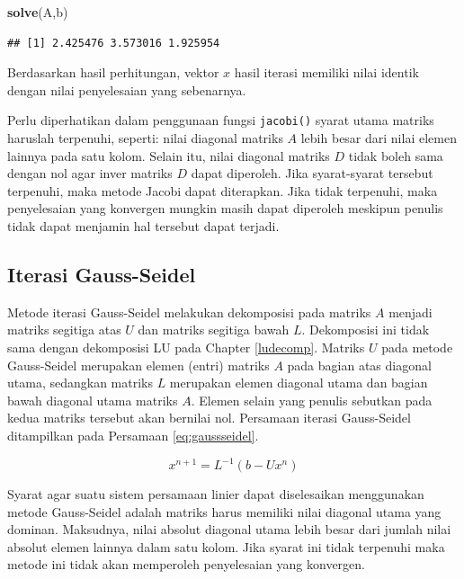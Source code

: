 \documentclass[]{book}
\newenvironment{Shaded}{\begin{snugshade}}{\end{snugshade}}
\newcommand{\KeywordTok}[1]{\textcolor[rgb]{0.13,0.29,0.53}{\textbf{#1}}}
\newcommand{\NormalTok}[1]{#1}
\theoremstyle{definition}
\theoremstyle{definition}
\theoremstyle{definition}
\theoremstyle{remark}
\begin{document}
\begin{Shaded}
\begin{Highlighting}[]
\KeywordTok{solve}\NormalTok{(A,b)}
\end{Highlighting}
\end{Shaded}

\begin{verbatim}
## [1] 2.425476 3.573016 1.925954
\end{verbatim}

Berdasarkan hasil perhitungan, vektor \(x\) hasil iterasi memiliki nilai identik dengan nilai penyelesaian yang sebenarnya.

Perlu diperhatikan dalam penggunaan fungsi \texttt{jacobi()} syarat utama matriks haruslah terpenuhi, seperti: nilai diagonal matriks \(A\) lebih besar dari nilai elemen lainnya pada satu kolom. Selain itu, nilai diagonal matriks \(D\) tidak boleh sama dengan nol agar inver matriks \(D\) dapat diperoleh. Jika syarat-syarat tersebut terpenuhi, maka metode Jacobi dapat diterapkan. Jika tidak terpenuhi, maka penyelesaian yang konvergen mungkin masih dapat diperoleh meskipun penulis tidak dapat menjamin hal tersebut dapat terjadi.

\hypertarget{seideliter}{%
\subsection{Iterasi Gauss-Seidel}\label{seideliter}}

Metode iterasi Gauss-Seidel melakukan dekomposisi pada matriks \(A\) menjadi matriks segitiga atas \(U\) dan matriks segitiga bawah \(L\). Dekomposisi ini tidak sama dengan dekomposisi LU pada Chapter \ref{ludecomp}. Matriks \(U\) pada metode Gauss-Seidel merupakan elemen (entri) matriks \(A\) pada bagian atas diagonal utama, sedangkan matriks \(L\) merupakan elemen diagonal utama dan bagian bawah diagonal utama matriks \(A\). Elemen selain yang penulis sebutkan pada kedua matriks tersebut akan bernilai nol. Persamaan iterasi Gauss-Seidel ditampilkan pada Persamaan \eqref{eq:gaussseidel}.

\begin{equation}
x^{n+1}=L^{-1}\left(b-Ux^{n}\right)
 \label{eq:gaussseidel}
\end{equation}

Syarat agar suatu sistem persamaan linier dapat diselesaikan menggunakan metode Gauss-Seidel adalah matriks harus memiliki nilai diagonal utama yang dominan. Maksudnya, nilai absolut diagonal utama lebih besar dari jumlah nilai absolut elemen lainnya dalam satu kolom. Jika syarat ini tidak terpenuhi maka metode ini tidak akan memperoleh penyelesaian yang konvergen.
\end{document}
